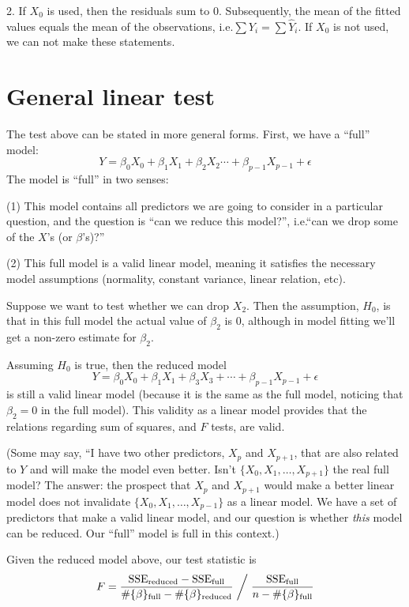 \documentclass[12pt]{article}
\newcommand\SSE{\text{SSE}}
\begin{document}
2. If $X_0$ is used, then the residuals sum to 0.
Subsequently, the mean of the fitted values equals the mean of the
observations, i.e.\@ $\sum Y_i = \sum \hat{Y}_i$.
If $X_0$ is not used, we can not make these statements.


\section{General linear test}

The test above can be stated in more general forms.
First, we have a ``full'' model:
\[
Y = \beta_0 X_0 + \beta_1 X_1 + \beta_2 X_2 \dotsb + \beta_{p-1}X_{p-1} + \epsilon
\]
The model is ``full'' in two senses:

(1) This model contains all predictors we are going to consider
in a particular question, and the question is ``can we reduce this
model?'', i.e.\@ ``can we drop some of the $X$'s (or $\beta$'s)?''

(2) This full model is a valid linear model, meaning it satisfies
the necessary model assumptions (normality, constant variance, linear
relation, etc).

Suppose we want to test whether we can drop $X_2$.
Then the assumption, $H_0$, is that in this full model the actual value
of $\beta_2$ is 0, although in model fitting we'll get a non-zero
estimate for $\beta_2$.

Assuming $H_0$ is true, then the reduced model
\[
Y = \beta_0 X_0 + \beta_1 X_1 + \beta_3X_3 + \dotsb + \beta_{p-1}X_{p-1} + \epsilon
\]
is still a valid linear model (because it is the same as the full model,
noticing that $\beta_2 = 0$ in the full model).
This validity as a linear model provides that the relations regarding
sum of squares, and $F$ tests, are valid.

(Some may say, ``I have two other predictors, $X_{p}$ and $X_{p+1}$,
that are also related to $Y$ and will make the model even better.
Isn't $\{X_0, X_1,\dotsc, X_{p+1}\}$ the real full model?
The answer: the prospect that
$X_p$ and $X_{p+1}$ would make a better linear model does not
invalidate $\{X_0, X_1, \dotsc, X_{p-1}\}$ as a linear model.
We have a set of predictors that make a valid linear model,
and our question is whether \emph{this} model can be reduced.
Our ``full'' model is full in this context.)

Given the reduced model above,
our test statistic is
\[
F = \frac{\SSE_{\text{reduced}} - \SSE_{\text{full}}}
        {\#\{\beta\}_{\text{full}} - \#\{\beta\}_{\text{reduced}}}
    \biggm/
    \frac{\SSE_{\text{full}}}
        {n - \#\{\beta\}_{\text{full}}}
\]
\end{document}
